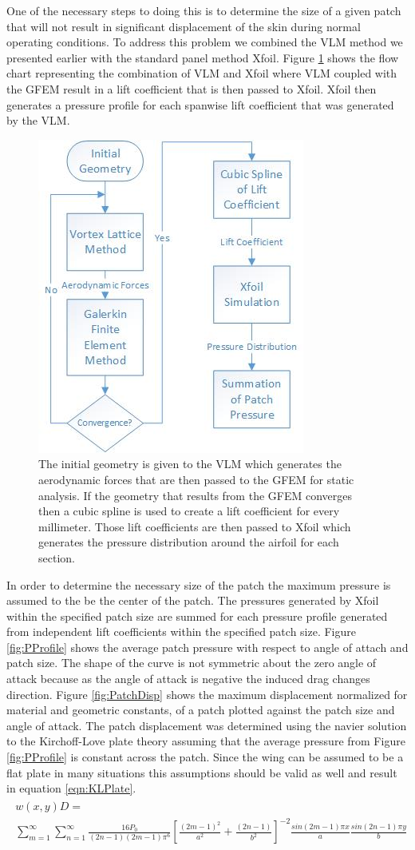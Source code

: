 \documentclass[11pt]{ucthesis}
\begin{document}
One of the necessary steps to doing this is to determine the size of a given patch that will not result in significant displacement of the skin during normal operating conditions. To address this problem we combined the VLM method we presented earlier with the standard panel method Xfoil. Figure \ref{fig:PPFlow} shows the flow chart representing the combination of VLM and Xfoil where VLM coupled with the GFEM result in a lift coefficient that is then passed to Xfoil. Xfoil then generates a pressure profile for each spanwise lift coefficient that was generated by the VLM.
\begin{figure}[thpb]
\centering
\includegraphics[width=0.3\linewidth]{Figures/PatchPressureFlowChart.jpg}
\caption{The initial geometry is given to the VLM which generates the aerodynamic forces that are then passed to the GFEM for static analysis. If the geometry that results from the GFEM converges then a cubic spline is used to create a lift coefficient for every millimeter. Those lift coefficients are then passed to Xfoil which generates the pressure distribution around the airfoil for each section.}
\label{fig:PPFlow}
\end{figure}

In order to determine the necessary size of the patch the maximum pressure is assumed to the be the center of the patch. The pressures generated by Xfoil  within the specified patch size are summed for each pressure profile generated from independent lift coefficients within the specified patch size. Figure \ref{fig:PProfile} shows the average patch pressure with respect to angle of attach and patch size. The shape of the curve is not symmetric about the zero angle of attack because as the angle of attack is negative the induced drag changes direction. Figure \ref{fig:PatchDisp} shows the maximum displacement normalized for material and geometric constants, of a patch plotted against the patch size and angle of attack. The patch displacement was determined using the navier solution to the Kirchoff-Love plate theory assuming that the average pressure from Figure \ref{fig:PProfile} is constant across the patch. Since the wing can be assumed to be a flat plate in many situations this assumptions should be valid as well and result in equation \ref{eqn:KLPlate}.
\small
\begin{eqnarray}
\begin{matrix}
w(x,y)D = \\\sum_{m=1}^{\infty}\sum_{n=1}^{\infty}\frac{16P_0}{(2n-1)(2m-1)\pi^6}\left[\frac{(2m-1)^2}{a^2}+\frac{(2n-1)}{b^2}\right]^{-2}\frac{sin(2m-1)\pi x}{a}\frac{sin(2n-1)\pi y}{b}
\end{matrix}
\label{eqn:KLPlate}
\end{eqnarray}
\normalsize
\end{document}
